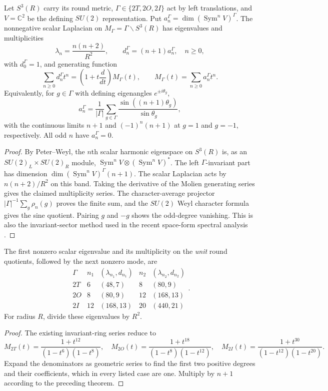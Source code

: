 \documentclass[11pt]{article}
\begin{document}
\begin{theorem}
\label{p1b:thm:v12-full-scalar-spectrum}
Let $S^3(R)$ carry its round metric, $\Gamma\in\{2T,2O,2I\}$
act by left translations, and $V=\mathbb C^2$ be the defining
$SU(2)$ representation.  Put
$a_n^\Gamma=\dim(\operatorname{Sym}^n V)^\Gamma$.
The nonnegative scalar Laplacian on $M_\Gamma=\Gamma\backslash S^3(R)$
has eigenvalues and multiplicities
\[
 \boxed{\lambda_n=\frac{n(n+2)}{R^2},\qquad
 d_n^\Gamma=(n+1)a_n^\Gamma,\quad n\ge0,}
\]
with $d_0^\Gamma=1$, and generating function
\[
 \sum_{n\ge0}d_n^\Gamma t^n
 =\left(1+t\frac{d}{dt}\right)M_\Gamma(t),\qquad
 M_\Gamma(t)=\sum_{n\ge0}a_n^\Gamma t^n.
\]
Equivalently, for $g\in\Gamma$ with defining eigenangles
$e^{\pm i\theta_g}$,
\[
 a_n^\Gamma=\frac1{|\Gamma|}\sum_{g\in\Gamma}
 \frac{\sin((n+1)\theta_g)}{\sin\theta_g},
\]
with the continuous limits $n+1$ and $(-1)^n(n+1)$ at $g=1$
and $g=-1$, respectively.  All odd $n$ have $a_n^\Gamma=0$.
\end{theorem}
\begin{proof}
By Peter--Weyl, the $n$th scalar harmonic eigenspace on $S^3(R)$
is, as an $SU(2)_L\times SU(2)_R$ module,
$\operatorname{Sym}^nV\otimes(\operatorname{Sym}^nV)^*$.
The left $\Gamma$-invariant part has dimension
$\dim(\operatorname{Sym}^nV)^\Gamma(n+1)$.
The scalar Laplacian acts by $n(n+2)/R^2$ on this band.
Taking the derivative of the Molien generating series gives the
claimed multiplicity series.  The character-average projector
$|\Gamma|^{-1}\sum_g \rho_n(g)$ proves the finite sum, and the
$SU(2)$ Weyl character formula gives the sine quotient.  Pairing
$g$ and $-g$ shows the odd-degree vanishing.
This is also the invariant-sector method used in the recent
space-form spectral analysis \cite{MartinMerinoPoddarRoby2026SpaceForms}.
\end{proof}

\begin{corollary}
\label{p1b:cor:v12-quotient-scalar-gaps}
The first nonzero scalar eigenvalue and its multiplicity on the
\emph{unit} round quotients, followed by the next nonzero mode, are
\[
\begin{array}{c|c|c|c|c}
\Gamma& n_1 & (\lambda_{n_1},d_{n_1})&n_2&(\lambda_{n_2},d_{n_2})\\\hline
2T&6&(48,7)&8&(80,9)\\
2O&8&(80,9)&12&(168,13)\\
2I&12&(168,13)&20&(440,21)
\end{array}.
\]
For radius $R$, divide these eigenvalues by $R^2$.
\end{corollary}
\begin{proof}
The existing invariant-ring series reduce to
\[
 M_{2T}(t)=\frac{1+t^{12}}{(1-t^6)(1-t^8)},\quad
 M_{2O}(t)=\frac{1+t^{18}}{(1-t^8)(1-t^{12})},\quad
 M_{2I}(t)=\frac{1+t^{30}}{(1-t^{12})(1-t^{20})}.
\]
Expand the denominators as geometric series to find the first two
positive degrees and their coefficients, which in every listed case
are one.  Multiply by $n+1$ according to the preceding theorem.
\end{proof}
\end{document}
